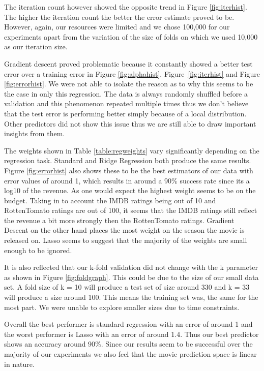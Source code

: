 \documentclass[conference]{IEEEtran}
\begin{document}
The iteration count however showed the opposite trend in Figure \ref{fig:iterhist}. 
The higher the iteration count the better the error estimate proved to be. However, again,
our resources were limited and we chose 100,000 for our experiments apart from the 
variation of the size of folds on which we used 10,000 as our iteration size. 

Gradient descent proved problematic because it constantly showed a better test error 
over a training error in Figure \ref{fig:alphahist}, Figure~\ref{fig:iterhist} and Figure \ref{fig:errorhist}. 
We were not able to isolate the reason as to why this seems to be the case in only this 
regression. The data is always randomly shuffled before a validation and this phenomenon repeated 
multiple times thus we don't believe that the test error is performing better simply because 
of a local distribution. Other predictors did not show this issue thus we are still able to draw
important insights from them. 

The weights shown in Table \ref{table:regweights} vary significantly depending on the regression task. Standard and 
Ridge Regression both produce the same results. Figure \ref{fig:errorhist} also shows these to be the best
estimators of our data with error values of around 1, which results in around a 90\% success rate since its 
a log10 of the revenue. As one would expect the highest weight seems to be on the budget. Taking in to account the IMDB ratings being out of 10 and RottenTomato ratings are out of 100, it seems that the IMDB ratings still reflect
the revenue a bit more strongly then the RottenTomato ratings. Gradient Descent on the other hand places 
the most weight on the season the movie is released on. Lasso seems to suggest that the majority of the 
weights are small enough to be ignored. 

It is also reflected that our k-fold validation did not change with the k parameter as shown in Figure \ref{fig:foldgraph}.
This could be due to the size of our small data set. A fold size of k = 10 will produce a test set of size around 330
and k = 33 will produce a size around 100. This means the training set was, the same for the most part. We were unable to explore smaller sizes due to time constraints. 

Overall the best performer is standard regression with an error of around 1 and the worst performer is Lasso with an error of around 1.4. Thus our best predictor shows an accuracy around 90\%. Since our results seem to be successful over the majority of our experiments we also feel that the movie prediction space is linear in nature. 
\end{document}
